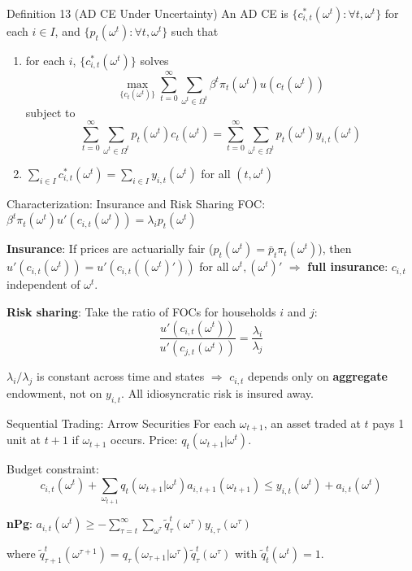 \documentclass[blue]{beamer}
\begin{document}
\begin{frame}{Definition 13 (AD CE Under Uncertainty)}
	An AD CE is $\{c_{i,t}^*(\omega^t) : \forall t, \omega^t\}$ for each $i \in I$, and $\{p_t(\omega^t) : \forall t, \omega^t\}$ such that
	
	\begin{enumerate}
		\item for each $i$, $\{c_{i,t}^*(\omega^t)\}$ solves
		\[
		\max_{\{c_t(\omega^t)\}} \sum_{t=0}^{\infty} \sum_{\omega^t \in \Omega^t} \beta^t \pi_t(\omega^t) u(c_t(\omega^t))
		\]
		subject to
		\[
		\sum_{t=0}^{\infty} \sum_{\omega^t \in \Omega^t} p_t(\omega^t) c_t(\omega^t) = \sum_{t=0}^{\infty} \sum_{\omega^t \in \Omega^t} p_t(\omega^t) y_{i,t}(\omega^t)
		\]
		
		\item $\sum_{i \in I} c_{i,t}^*(\omega^t) = \sum_{i \in I} y_{i,t}(\omega^t)$ for all $(t, \omega^t)$
	\end{enumerate}
\end{frame}

\begin{frame}{Characterization: Insurance and Risk Sharing}
	FOC: $\beta^t \pi_t(\omega^t) u'(c_{i,t}(\omega^t)) = \lambda_i p_t(\omega^t)$
	
	\bigskip
	\textbf{Insurance}: If prices are actuarially fair ($p_t(\omega^t) = \bar{p}_t \pi_t(\omega^t)$), then $u'(c_{i,t}(\omega^t)) = u'(c_{i,t}((\omega^t)'))$ for all $\omega^t, (\omega^t)'$ $\Rightarrow$ \textbf{full insurance}: $c_{i,t}$ independent of $\omega^t$.
	
	\bigskip
	\textbf{Risk sharing}: Take the ratio of FOCs for households $i$ and $j$:
	\[
	\frac{u'(c_{i,t}(\omega^t))}{u'(c_{j,t}(\omega^t))} = \frac{\lambda_i}{\lambda_j}
	\]
	
	$\lambda_i/\lambda_j$ is constant across time and states $\Rightarrow$ $c_{i,t}$ depends only on \textbf{aggregate} endowment, not on $y_{i,t}$. All idiosyncratic risk is insured away.
\end{frame}

\begin{frame}{Sequential Trading: Arrow Securities}
	For each $\omega_{t+1}$, an asset traded at $t$ pays 1 unit at $t+1$ if $\omega_{t+1}$ occurs. Price: $q_t(\omega_{t+1} | \omega^t)$.
	
	\bigskip
	Budget constraint:
	\[
	c_{i,t}(\omega^t) + \sum_{\omega_{t+1}} q_t(\omega_{t+1} | \omega^t) a_{i,t+1}(\omega_{t+1}) \leq y_{i,t}(\omega^t) + a_{i,t}(\omega^t)
	\]
	
	\textbf{nPg}: $a_{i,t}(\omega^t) \geq -\sum_{\tau=t}^{\infty} \sum_{\omega^\tau} \tilde{q}_\tau^t(\omega^\tau) y_{i,\tau}(\omega^\tau)$
	
	where $\tilde{q}_{\tau+1}^t(\omega^{\tau+1}) = q_\tau(\omega_{\tau+1} | \omega^\tau) \tilde{q}_\tau^t(\omega^\tau)$ with $\tilde{q}_t^t(\omega^t) = 1$.
\end{frame}
\end{document}
